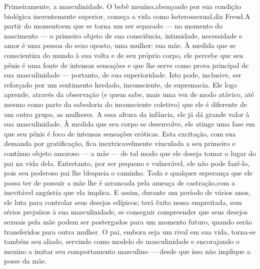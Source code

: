  Primeiramente, a masculinidade. O bebê menino,\idxconfemeni[|(] abençoado por sua
condição biológica inerentemente superior, começa a vida como\idxconfehete{} heterossexual,\idxheteroconf[|(] diz Freud.\idxfreudedipo[|(] A partir do momento\idxidenedi[|(] em que se torna um ser
separado --- no momento do nascimento --- o primeiro objeto de sua
consciência, intimidade, necessidade e amor é uma pessoa do sexo
oposto, uma mulher: sua mãe. À medida que se conscientiza do mundo à
sua volta e de seu próprio corpo, ele percebe que seu pênis é uma fonte
de intensas sensações e que lhe serve como prova principal de sua
masculinidade --- portanto, de sua superioridade. Isto pode, inclusive,
ser reforçado por um sentimento herdado, inconsciente, de supremacia.
Ele logo aprende, através da observação (e quem sabe, mais uma vez de
modo atávico, até mesmo como parte da sabedoria do inconsciente
coletivo) que ele é diferente de um outro grupo, as mulheres. A essa
altura da infância, ele já dá grande valor à sua masculinidade.
À medida que seu corpo se desenvolve, ele atinge uma fase em que seu pênis
é foco de intensas sensações eróticas. Esta excitação, com sua demanda
por gratificação, fica inextricavelmente vinculada a seu primeiro e
contínuo objeto amoroso --- a mãe --- de tal modo que ele deseja
tomar o lugar do pai na vida dela. Entretanto, por ser pequeno e
vulnerável, ele não pode fazê-lo, pois seu poderoso pai\idxmascupat{} lhe bloqueia o
caminho. Toda e qualquer esperança que ele possa ter de possuir a mãe
lhe é arrancada pela ameaça de castração,\idxcastaconf[|(] com a inevitável angústia que
ela implica. E assim, durante um período de vários anos, ele luta para
controlar seus desejos edípicos; terá êxito nessa empreitada, sem
sérios prejuízos à sua masculinidade,\idxpaismasc{} se conseguir compreender que
seus desejos sexuais pela mãe podem ser postergados para um momento
futuro, quando serão transferidos para outra mulher. O pai, embora
seja um rival em sua vida, torna-se também seu aliado, servindo como
modelo de masculinidade e encorajando o menino a imitar seu
comportamento masculino --- desde que isso não implique a posse\idxconfemeni{} da mãe.


